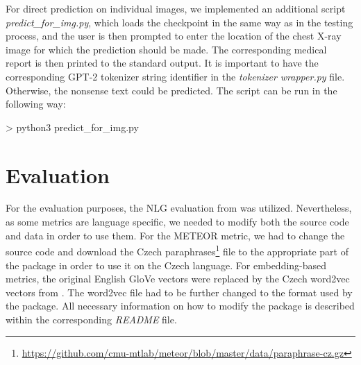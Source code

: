 For direct prediction on individual images, we implemented an additional script \textit{predict\_for\_img.py}, which loads the checkpoint in the same way as in the testing process, and the user is then prompted to enter the location of the chest X-ray image for which the prediction should be made. The corresponding medical report is then printed to the standard output. It is important to have the corresponding GPT-2 tokenizer string identifier in the \textit{tokenizer wrapper.py} file. Otherwise, the nonsense text could be predicted. The script can be run in the following way:
\begin{code}
> python3 predict_for_img.py
\end{code}

\section{Evaluation}
For the evaluation purposes, the NLG evaluation from \citet{sharma2017nlgeval} was utilized. Nevertheless, as some metrics are language specific, we needed to modify both the source code and data in order to use them. For the METEOR metric, we had to change the source code and download the Czech paraphrases\footnote[6]{\url{https://github.com/cmu-mtlab/meteor/blob/master/data/paraphrase-cz.gz}} file to the appropriate part of the package in order to use it on the Czech language. For embedding-based metrics, the original English GloVe vectors were replaced by the Czech word2vec vectors from \citet{grave2018learning}. The word2vec file had to be further changed to the format used by the package. All necessary information on how to modify the package is described within the corresponding \textit{README} file.
